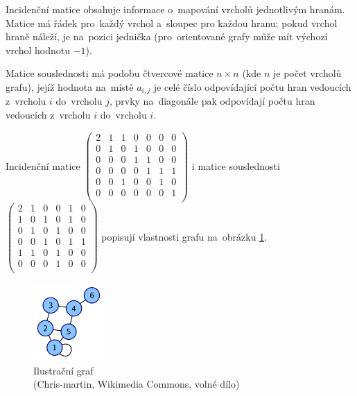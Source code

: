 Incidenční matice obsahuje informace o~mapování vrcholů jednotlivým hranám.
Matice má řádek pro~každý vrchol a~sloupec pro každou hranu; pokud vrchol hraně náleží, je na~pozici jednička (pro~orientované grafy může mít výchozí vrchol hodnotu $-1$).

Matice souslednosti má podobu čtvercové matice $n \times n$ (kde $n$ je počet vrcholů grafu), jejíž hodnota na~místě $a_{i,j}$ je celé číslo odpovídající počtu hran vedoucích z~vrcholu $i$ do~vrcholu $j$, prvky na~diagonále pak odpovídají počtu hran vedoucích z~vrcholu $i$ do~vrcholu $i$.

Incidenční matice
$\left( \begin{matrix}
2 & 1 & 1 & 0 & 0 & 0 & 0 \\
0 & 1 & 0 & 1 & 0 & 0 & 0 \\
0 & 0 & 0 & 1 & 1 & 0 & 0 \\
0 & 0 & 0 & 0 & 1 & 1 & 1 \\
0 & 0 & 1 & 0 & 0 & 1 & 0 \\
0 & 0 & 0 & 0 & 0 & 0 & 1 \\
\end{matrix} \right)$ 
i matice souslednosti
$\left( \begin{matrix}
2 & 1 & 0 & 0 & 1 & 0 \\
1 & 0 & 1 & 0 & 1 & 0 \\
0 & 1 & 0 & 1 & 0 & 0 \\
0 & 0 & 1 & 0 & 1 & 1 \\
1 & 1 & 0 & 1 & 0 & 0 \\
0 & 0 & 0 & 1 & 0 & 0 \\
\end{matrix} \right)$
popisují vlastnosti grafu na~obrázku \ref{ilustracni-graf-matice}.

\begin{figure}[ht]
\centering
\includegraphics[height=8em]{images/3_graf-matice-souslednosti}

\caption[Ilustrační graf]{Ilustrační graf\\{\small (Chris-martin, Wikimedia Commons, volné dílo)}}
\label{ilustracni-graf-matice}
\end{figure}

